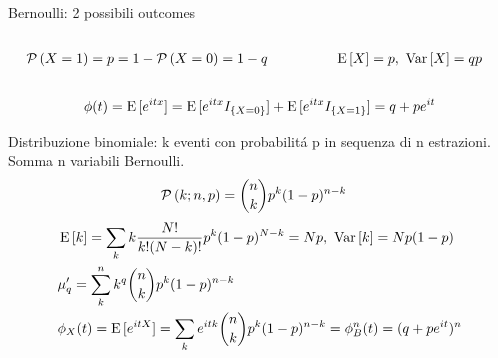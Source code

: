 \documentclass[asd-beamer.tex]{subfiles}%
\begin{document}
\begin{frame}{}
\begin{block}{Bernoulli: 2 possibili outcomes}
	\begin{columns}[T]
	\begin{column}{0.6\textwidth}
	\begin{align*}
	&\operatorname{\mathcal{P}}{(X=1)}=p=1-\operatorname{\mathcal{P}}{(X=0)}=1-q
	\end{align*}
	\end{column}
	\begin{column}{0.4\textwidth}
	\begin{align*}
	&\operatorname{E}{[X]}=p,\ \operatorname{Var}{[X]}=qp
	\end{align*}
	\end{column}
	\end{columns}
\[\phi(t)=\operatorname{E}{[e^{itx}]}=\operatorname{E}{[e^{itx}I_{\{X=0\}}]}+\operatorname{E}{[e^{itx}I_{\{X=1\}}]}=q+pe^{it}\]
\end{block}
\begin{block}{Distribuzione binomiale: k eventi con probabilit\'a p in sequenza di n estrazioni. Somma n variabili Bernoulli.}
\begin{align*}
&\operatorname{\mathcal{P}}{(k;n,p)}=\binom{n}{k}p^k(1-p)^{n-k}
\end{align*}
\begin{align*}
&\E{[k]}=\sum_kk\frac{N!}{k!(N-k)!}p^k(1-p)\expy{N-k}=Np,\ \var{[k]}=Np(1-p)\\
&\mu'_q=\sum_k^nk^q\binom{n}{k}p^k(1-p)^{n-k}\\
&\phi_X(t)=\E{[\exp{itX}]}=\sum_k\exp{itk}\binom{n}{k}p^k(1-p)^{n-k}=\phi_B^n(t)=(q+p\exp{it})^n
\end{align*}
\end{block}
\end{frame}
\end{document}

